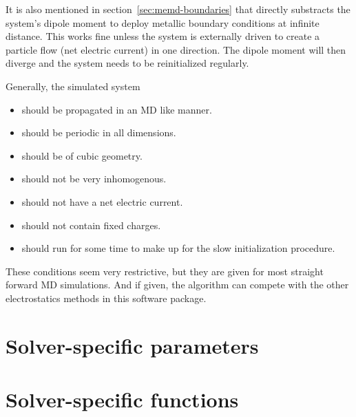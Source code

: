 It is also mentioned in section~\ref{sec:memd-boundaries} that \memd{} directly substracts the system's dipole moment to deploy metallic boundary conditions at infinite distance. This works fine unless the system is externally driven to create a particle flow (net electric current) in one direction. The dipole moment will then diverge and the system needs to be reinitialized regularly.

Generally, the simulated system

\begin{itemize}
\item should be propagated in an MD like manner.
\item should be periodic in all dimensions.
\item should be of cubic geometry.
\item should not be very inhomogenous.
\item should not have a net electric current.
\item should not contain fixed charges.
\item should run for some time to make up for the slow initialization procedure.
\end{itemize}

These conditions seem very restrictive, but they are given for most straight forward MD simulations. And if given, the algorithm can compete with the other electrostatics methods in this software package.


%

\section{Solver-specific parameters}

\section{Solver-specific functions}

